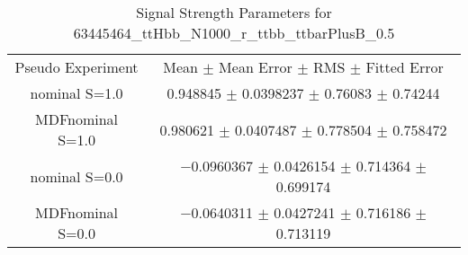 \begin{table}
\centering
\caption{Signal Strength Parameters for 63445464\_ttHbb\_N1000\_r\_ttbb\_ttbarPlusB\_0.5}
\begin{tabular}{cc}
\toprule
Pseudo Experiment & Mean $\pm$ Mean Error $\pm$ RMS $\pm$ Fitted Error\\
nominal S=1.0 & \num{0.948845} $\pm$ \num{0.0398237} $\pm$ \num{0.76083} $\pm$ \num{0.74244}\\
MDFnominal S=1.0 & \num{0.980621} $\pm$ \num{0.0407487} $\pm$ \num{0.778504} $\pm$ \num{0.758472}\\
nominal S=0.0 & \num{-0.0960367} $\pm$ \num{0.0426154} $\pm$ \num{0.714364} $\pm$ \num{0.699174}\\
MDFnominal S=0.0 & \num{-0.0640311} $\pm$ \num{0.0427241} $\pm$ \num{0.716186} $\pm$ \num{0.713119}\\
\bottomrule
\end{tabular}
\end{table}